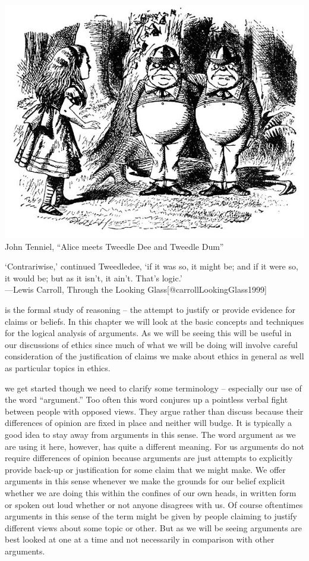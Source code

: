\documentclass[justified]{tufte-book}
\newenvironment{epigraph}%
{
\begin{flushright}
\begin{minipage}{20em}
\begin{flushright}
\itshape
}%
{
\end{flushright}
\end{minipage}
\end{flushright}
}
\begin{document}
\begin{marginfigure}
\includegraphics{img/tenniel-tweedle-dee-dum.jpg} John Tenniel, ``Alice
meets Tweedle Dee and Tweedle Dum''
\end{marginfigure}

\begin{epigraph}
`Contrariwise,' continued Tweedledee, `if it was so, it might be; and if
it were so, it would be; but as it isn't, it ain't. That's logic.'\\
---Lewis Carroll, Through the Looking
Glass{[}@carrollLookingGlass1999{]}
\end{epigraph}

 is the formal study of reasoning -- the attempt to justify or provide evidence for claims or beliefs. In this chapter we will look at the basic concepts and techniques for the logical analysis of arguments. As we will be seeing this will be useful in our discussions of ethics since much of what we will be doing will involve careful consideration of the justification of claims we make about ethics in general as well as particular topics in ethics.

 we get started though we need to clarify some terminology -- especially our use of the word ``argument.'' Too often this word conjures up a pointless verbal fight between people with opposed views. They argue rather than discuss because their differences of opinion are fixed in place and neither will budge. It is typically a good idea to stay away from arguments in this sense. The word argument as we are using it here, however, has quite a different meaning. For us arguments do not require differences of opinion because arguments are just attempts to explicitly provide back-up or justification for some claim that we might make. We offer arguments in this sense whenever we make the grounds for our belief explicit whether we are doing this within the confines of our own heads, in written form or spoken out loud whether or not anyone disagrees with us. Of course oftentimes arguments in this sense of the term might be given by people claiming to justify different views about some topic or other. But as we will be seeing arguments are best looked at one at a time and not necessarily in comparison with other arguments.
\end{document}
